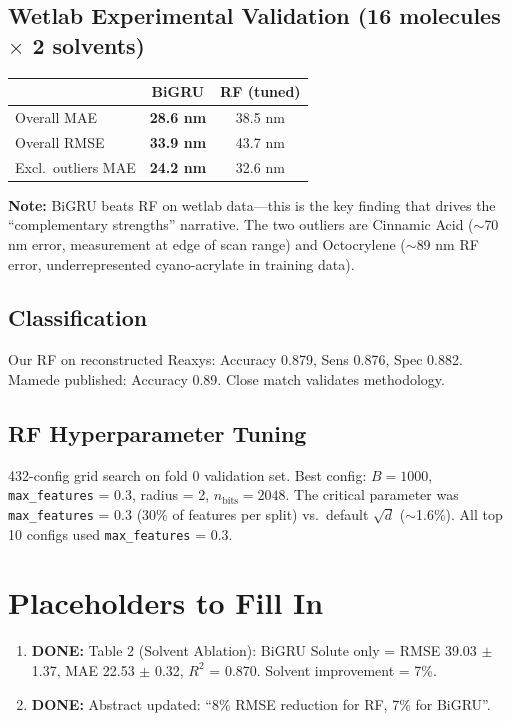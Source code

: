 \documentclass[11pt,a4paper]{article}
\newcommand{\DONE}[1]{\textcolor{done}{\textbf{DONE:} #1}}
\newcommand{\NOTE}[1]{\textcolor{info}{\textbf{Note:} #1}}
\begin{document}
\subsection{Wetlab Experimental Validation (16 molecules $\times$ 2 solvents)}

\begin{tabular}{lcc}
\toprule
& \textbf{BiGRU} & \textbf{RF (tuned)} \\
\midrule
Overall MAE  & \textbf{28.6 nm} & 38.5 nm \\
Overall RMSE & \textbf{33.9 nm} & 43.7 nm \\
Excl.\ outliers MAE & \textbf{24.2 nm} & 32.6 nm \\
\bottomrule
\end{tabular}

\NOTE{BiGRU beats RF on wetlab data---this is the key finding that drives the ``complementary strengths'' narrative. The two outliers are Cinnamic Acid ($\sim$70 nm error, measurement at edge of scan range) and Octocrylene ($\sim$89 nm RF error, underrepresented cyano-acrylate in training data).}

\subsection{Classification}
Our RF on reconstructed Reaxys: Accuracy 0.879, Sens 0.876, Spec 0.882. Mamede published: Accuracy 0.89. Close match validates methodology.

\subsection{RF Hyperparameter Tuning}
432-config grid search on fold 0 validation set. Best config: $B = 1000$, \texttt{max\_features} = 0.3, radius = 2, $n_{\text{bits}} = 2048$. The critical parameter was \texttt{max\_features} = 0.3 (30\% of features per split) vs.\ default $\sqrt{d}$ ($\sim$1.6\%). All top 10 configs used \texttt{max\_features} = 0.3.


\section{Placeholders to Fill In}

\begin{enumerate}
    \item \DONE{Table 2 (Solvent Ablation): BiGRU Solute only = RMSE 39.03 $\pm$ 1.37, MAE 22.53 $\pm$ 0.32, $R^2$ = 0.870. Solvent improvement = 7\%.}
    \item \DONE{Abstract updated: ``8\% RMSE reduction for RF, 7\% for BiGRU''.}
\end{enumerate}
\end{document}
